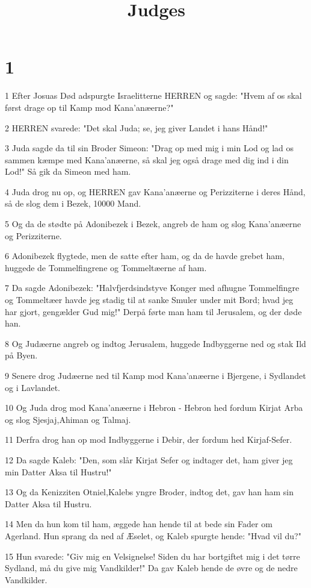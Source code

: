 

\title{Judges}


\chapter{1}

\par 1 Efter Josuas Død adspurgte Israelitterne HERREN og sagde: "Hvem af os skal først drage op til Kamp mod Kana'anæerne?"
\par 2 HERREN svarede: "Det skal Juda; se, jeg giver Landet i hans Hånd!"
\par 3 Juda sagde da til sin Broder Simeon: "Drag op med mig i min Lod og lad os sammen kæmpe med Kana'anæerne, så skal jeg også drage med dig ind i din Lod!" Så gik da Simeon med ham.
\par 4 Juda drog nu op, og HERREN gav Kana'anæerne og Perizziterne i deres Hånd, så de slog dem i Bezek, 10000 Mand.
\par 5 Og da de stødte på Adonibezek i Bezek, angreb de ham og slog Kana'anæerne og Perizziterne.
\par 6 Adonibezek flygtede, men de satte efter ham, og da de havde grebet ham, huggede de Tommelfingrene og Tommeltæerne af ham.
\par 7 Da sagde Adonibezek: "Halvfjerdsindstyve Konger med afhugne Tommelfingre og Tommeltæer havde jeg stadig til at sanke Smuler under mit Bord; hvad jeg har gjort, gengælder Gud mig!" Derpå førte man ham til Jerusalem, og der døde han.
\par 8 Og Judæerne angreb og indtog Jerusalem, huggede Indbyggerne ned og stak Ild på Byen.
\par 9 Senere drog Judæerne ned til Kamp mod Kana'anæerne i Bjergene, i Sydlandet og i Lavlandet.
\par 10 Og Juda drog mod Kana'anæerne i Hebron - Hebron hed fordum Kirjat Arba og slog Sjesjaj,Ahiman og Talmaj.
\par 11 Derfra drog han op mod Indbyggerne i Debir, der fordum hed Kirjaf-Sefer.
\par 12 Da sagde Kaleb: "Den, som slår Kirjat Sefer og indtager det, ham giver jeg min Datter Aksa til Hustru!"
\par 13 Og da Kenizziten Otniel,Kalebs yngre Broder, indtog det, gav han ham sin Datter Aksa til Hustru.
\par 14 Men da hun kom til ham, æggede han hende til at bede sin Fader om Agerland. Hun sprang da ned af Æselet, og Kaleb spurgte hende: "Hvad vil du?"
\par 15 Hun svarede: "Giv mig en Velsignelse! Siden du har bortgiftet mig i det tørre Sydland, må du give mig Vandkilder!" Da gav Kaleb hende de øvre og de nedre Vandkilder.
